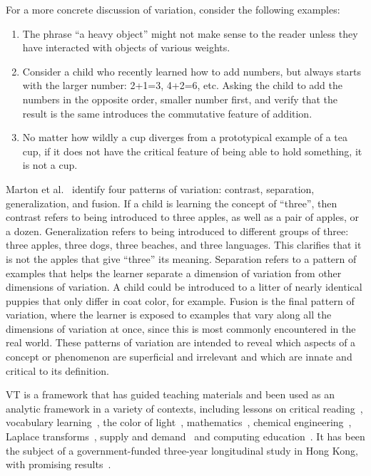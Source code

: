 For a more concrete discussion of variation, consider the following examples:
\begin{enumerate}
\item The phrase ``a heavy object'' might not make sense to the reader unless they have interacted with objects of various weights.
\item Consider a child who recently learned how to add numbers, but always starts with the larger number: 2+1=3, 4+2=6, etc. Asking the child to add the numbers in the opposite order, smaller number first, and verify that the result is the same introduces the commutative feature of addition.
\item No matter how wildly a cup diverges from a prototypical example of a tea cup, if it does not have the critical feature of being able to hold something, it is not a cup.
\end{enumerate}

Marton et al.~\cite{marton1997learning} identify four patterns of variation: contrast, separation, generalization, and fusion. If a child is learning the concept of ``three'', then contrast refers to being introduced to three apples, as well as a pair of apples, or a dozen. Generalization refers to being introduced to different groups of three: three apples, three dogs, three beaches, and three languages. This clarifies that it is not the apples that give ``three'' its meaning. Separation refers to a pattern of examples that helps the learner separate a dimension of variation from other dimensions of variation. A child could be introduced to a litter of nearly identical puppies that only differ in coat color, for example. Fusion is the final pattern of variation, where the learner is exposed to examples that vary along all the dimensions of variation at once, since this is most commonly encountered in the real world. These patterns of variation are intended to reveal which aspects of a concept or phenomenon are superficial and irrelevant and which are innate and critical to its definition.

VT is a framework that has guided teaching materials and been used as an analytic framework in a variety of contexts, including lessons on critical reading~\cite{noble1998contents}, vocabulary learning~\cite{doi:10.1108/IJLLS-10-2014-0038}, the color of light~\cite{Ling2006}, mathematics~\cite{Pythagoras233}, chemical engineering~\cite{C2RP20145C}, Laplace transforms~\cite{carstensen2004laplace}, supply and demand~\cite{marton2006some} and computing education~\cite{suhonen2007applications}. It has been the subject of a government-funded three-year longitudinal study in Hong Kong, with promising results~\cite{lo2005each}. 

